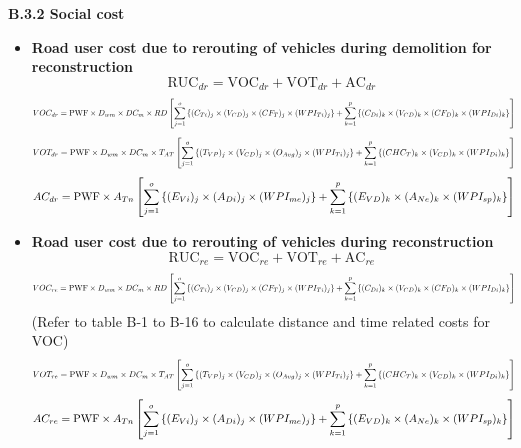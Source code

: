 \documentclass[12pt,a4paper]{article}
\begin{document}
\vspace{0.3em}
\textbf{B.3.2 Social cost}

\begin{itemize}
  \item \textbf{Road user cost due to rerouting of vehicles during demolition for reconstruction}
    \[ \mathrm{RUC}_{dr} = \mathrm{VOC}_{dr} + \mathrm{VOT}_{dr} + \mathrm{AC}_{dr} \]
    \[
    \resizebox{\linewidth}{!}{$\displaystyle
    VOC_{dr} = \mathrm{PWF} \times D_{wm} \times DC_m \times RD \left[
      \sum_{j=1}^{o} \left\{ (C_{Ti})_j \times (V_{CD})_j \times (CF_T)_j \times (WPI_{Ti})_j \right\}
      + \sum_{k=1}^{p} \left\{ (C_{Di})_k \times (V_{CD})_k \times (CF_D)_k \times (WPI_{Di})_k \right\}
    \right]
    $}
    \]
    \[
    \resizebox{\linewidth}{!}{$\displaystyle
    VOT_{dr} = \mathrm{PWF} \times D_{wm} \times DC_m \times T_{AT} \left[
      \sum_{j=1}^{o} \left\{ (T_{VP})_j \times (V_{CD})_j \times (O_{Avg})_j \times (WPI_{Ti})_j \right\}
      + \sum_{k=1}^{p} \left\{ (CHC_T)_k \times (V_{CD})_k \times (WPI_{Di})_k \right\}
    \right]
    $}
    \]
    \[
    \resizebox{\linewidth}{!}{$\displaystyle
    AC_{dr} = \mathrm{PWF} \times A_{Tn} \left[
      \sum_{j=1}^{o} \left\{ (E_{Vi})_j \times (A_{Di})_j \times (WPI_{me})_j \right\}
      + \sum_{k=1}^{p} \left\{ (E_{VD})_k \times (A_{Ne})_k \times (WPI_{sp})_k \right\}
    \right]
    $}
    \]

  \item \textbf{Road user cost due to rerouting of vehicles during reconstruction}
    \[ \mathrm{RUC}_{re} = \mathrm{VOC}_{re} + \mathrm{VOT}_{re} + \mathrm{AC}_{re} \]
    \[
    \resizebox{\linewidth}{!}{$\displaystyle
    VOC_{re} = \mathrm{PWF} \times D_{wm} \times DC_m \times RD \left[
      \sum_{j=1}^{o} \left\{ (C_{Ti})_j \times (V_{CD})_j \times (CF_T)_j \times (WPI_{Ti})_j \right\}
      + \sum_{k=1}^{p} \left\{ (C_{Di})_k \times (V_{CD})_k \times (CF_D)_k \times (WPI_{Di})_k \right\}
    \right]
    $}
    \]
    (Refer to table B-1 to B-16 to calculate distance and time related costs for VOC)
    \[
    \resizebox{\linewidth}{!}{$\displaystyle
    VOT_{re} = \mathrm{PWF} \times D_{wm} \times DC_m \times T_{AT} \left[
      \sum_{j=1}^{o} \left\{ (T_{VP})_j \times (V_{CD})_j \times (O_{Avg})_j \times (WPI_{Ti})_j \right\}
      + \sum_{k=1}^{p} \left\{ (CHC_T)_k \times (V_{CD})_k \times (WPI_{Di})_k \right\}
    \right]
    $}
    \]
    \[
    \resizebox{\linewidth}{!}{$\displaystyle
    AC_{re} = \mathrm{PWF} \times A_{Tn} \left[
      \sum_{j=1}^{o} \left\{ (E_{Vi})_j \times (A_{Di})_j \times (WPI_{me})_j \right\}
      + \sum_{k=1}^{p} \left\{ (E_{VD})_k \times (A_{Ne})_k \times (WPI_{sp})_k \right\}
    \right]
    $}
    \]


\end{itemize}
\end{document}
